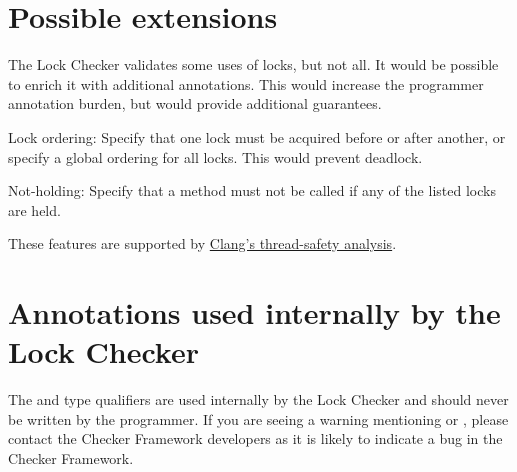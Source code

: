 \section{Possible extensions\label{lock-extensions}}

The Lock Checker validates some uses of locks, but not all.  It would be
possible to enrich it with additional annotations.  This would increase the
programmer annotation burden, but would provide additional guarantees.

Lock ordering:  Specify that one lock must be acquired before or after
another, or specify a global ordering for all locks.  This would prevent
deadlock.

Not-holding:  Specify that a method must not be called if any of the listed
locks are held.

These features are supported by
\href{http://clang.llvm.org/docs/ThreadSafetyAnalysis.html}{Clang's
  thread-safety analysis}.


\section{Annotations used internally by the Lock Checker\label{lock-internals}}

The  and  type qualifiers are used internally by the Lock Checker
and should never be written by the programmer.
If you
are seeing a warning mentioning  or ,
please contact the Checker Framework developers as it is likely to
indicate a bug in the Checker Framework.



